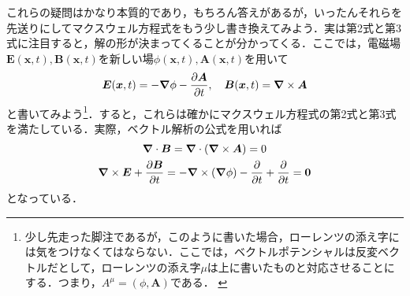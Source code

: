 \documentclass[a4paper,pdflatex,ja=standard]{bxjsarticle}
\begin{document}
これらの疑問はかなり本質的であり，もちろん答えがあるが，いったんそれらを先送りにしてマクスウェル方程式をもう少し書き換えてみよう．実は第2式と第3式に注目すると，解の形が決まってくることが分かってくる．ここでは，電磁場$\bm{E}(\bm{x},t),\bm{B}(\bm{x},t)$を新しい場$\phi(\bm{x},t),\bm{A}(\bm{x},t)$を用いて
\begin{equation}
  \bm{E}(\bm{x},t)
  =
  -
  \bm{\nabla}\phi
  -
  \pdv{\bm{A}}{t}
  ,\quad 
  \bm{B}(\bm{x},t)
  =
  \bm{\nabla}\times\bm{A}
  \label{gauge_elemag}
\end{equation}
と書いてみよう\footnote{
  少し先走った脚注であるが，このように書いた場合，ローレンツの添え字には気をつけなくてはならない．ここでは，ベクトルポテンシャルは反変ベクトルだとして，ローレンツの添え字$\mu$は上に書いたものと対応させることにする．つまり，$A^{\mu}=(\phi,\bm{A})$である．
  \label{note3}
}．すると，これらは確かにマクスウェル方程式の第2式と第3式を満たしている．実際，ベクトル解析の公式を用いれば
\begin{gather}
  \bm{\nabla}
  \cdot
  \bm{B}
  =
  \bm{\nabla}
  \cdot
  (\bm{\nabla}\times\bm{A})
  =
  0
  \\
  \bm{\nabla}
  \times
  \bm{E}
  +
  \pdv{\bm{B}}{t}
  =
  -
  \bm{\nabla}\times(\bm{\nabla}\phi)
  -
  \pdv{}{t}
  (\bm{\nabla}\times\bm{A})
  +
  \pdv{}{t}
  (\bm{\nabla}\times\bm{A})
  =
  \bm{0}
\end{gather}
となっている．
\end{document}
